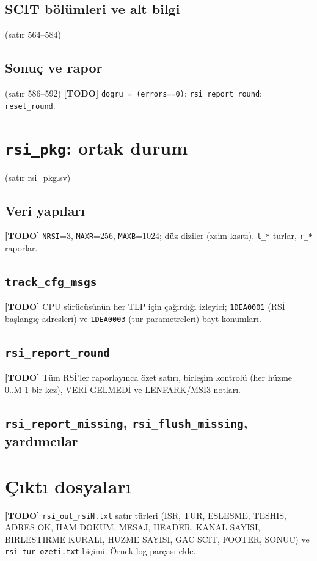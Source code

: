 \documentclass[11pt,a4paper]{article}
\newcommand{\kod}[1]{\texttt{#1}}
\newcommand{\todo}[1]{\textcolor{red!60!black}{\textbf{[TODO]} #1}}
\newcommand{\satir}[1]{\textcolor{black!60}{\scriptsize(satır #1)}}
\begin{document}
\subsection{SCIT bölümleri ve alt bilgi}
\satir{564--584}

\subsection{Sonuç ve rapor}
\satir{586--592} \todo{\kod{dogru = (errors==0)}; \kod{rsi\_report\_round}; \kod{reset\_round}.}

\section{\kod{rsi\_pkg}: ortak durum}
\satir{rsi\_pkg.sv}

\subsection{Veri yapıları}
\todo{\kod{NRSI}=3, \kod{MAXR}=256, \kod{MAXB}=1024; düz diziler (xsim kısıtı).
\kod{t\_*} turlar, \kod{r\_*} raporlar.}

\subsection{\kod{track\_cfg\_msgs}}
\todo{CPU sürücüsünün her TLP için çağırdığı izleyici; \kod{1DEA0001} (RSİ başlangıç
adresleri) ve \kod{1DEA0003} (tur parametreleri) bayt konumları.}

\subsection{\kod{rsi\_report\_round}}
\todo{Tüm RSİ'ler raporlayınca özet satırı, birleşim kontrolü (her hüzme 0..M-1 bir
kez), VERİ GELMEDİ ve LENFARK/MSI3 notları.}

\subsection{\kod{rsi\_report\_missing}, \kod{rsi\_flush\_missing}, yardımcılar}

\section{Çıktı dosyaları}

\todo{\kod{rsi\_out\_rsiN.txt} satır türleri (ISR, TUR, ESLESME, TESHIS, ADRES OK,
HAM DOKUM, MESAJ, HEADER, KANAL SAYISI, BIRLESTIRME KURALI, HUZME SAYISI, GAC SCIT,
FOOTER, SONUC) ve \kod{rsi\_tur\_ozeti.txt} biçimi. Örnek log parçası ekle.}
\end{document}
